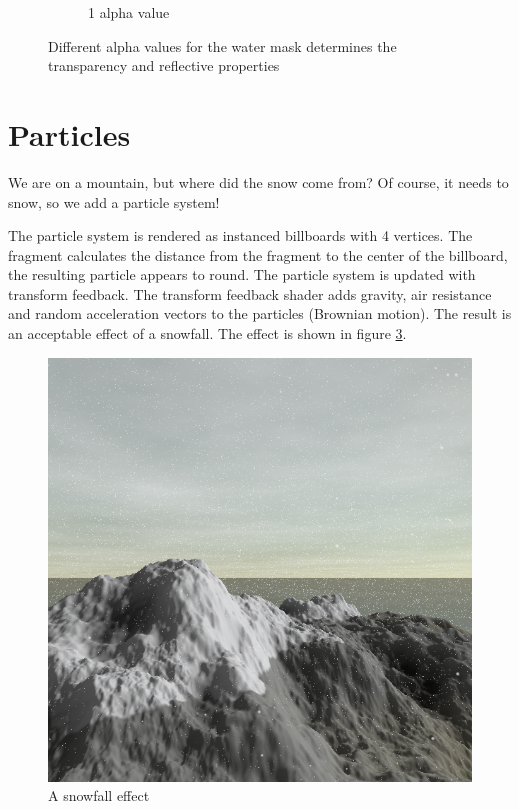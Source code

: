 \documentclass{article}
\begin{document}
\begin{figure}[H]
\begin{subfigure}[b]{0.45\textwidth}
        \caption{1 alpha value}
        \label{fig:waterAlpha1}
    \end{subfigure}
    \caption{Different alpha values for the water mask determines the transparency and reflective properties}
    \label{fig:waterAlpha}
\end{figure}

\section{Particles}
We are on a mountain, but where did the snow come from?
Of course, it needs to snow, so we add a particle system!

The particle system is rendered as instanced billboards with 4 vertices. The fragment calculates the distance from the fragment to the center of the billboard, the resulting particle appears to round.
The particle system is updated with transform feedback. The transform feedback shader adds gravity, air resistance and random acceleration vectors to the particles (Brownian motion). The result is an acceptable effect of a snowfall.
The effect is shown in figure \ref{fig:snowfall}.

\begin{figure}[H]
\centering
    \centering
    \includegraphics[scale=0.5]{snowfall}
    \caption{A snowfall effect}
    \label{fig:snowfall}
\end{figure}
\end{document}
